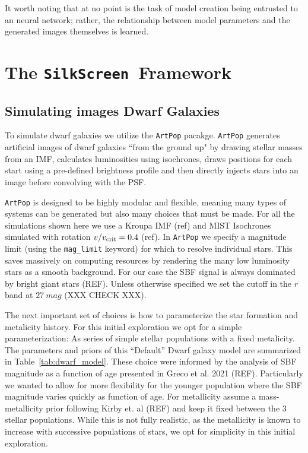 \documentclass[twocolumn]{aastex631}
\newcommand{\code}[0]{\texttt{SilkScreen}}
\newcommand{\artpop}[0]{\texttt{ArtPop}}
\begin{document}
It worth noting that at no point is the task of model creation being entrusted to an neural network; rather, the relationship between model parameters and the generated images themselves is learned. 

\section{The \code{}\ Framework}
\subsection{Simulating images Dwarf Galaxies}
\label{sec:sfh}
To simulate dwarf galaxies we utilize the \artpop{} pacakge. \artpop{} generates artificial images of dwarf galaxies ``from the ground up" by drawing stellar masses from an IMF, calculates luminosities using isochrones, draws positions for each start using a pre-defined brightness profile and then directly injects stars into an image before convolving with the PSF.

\artpop{} is designed to be highly modular and flexible, meaning many types of systems can be generated but also many choices that must be made. For all the simulations shown here we use a Kroupa IMF (ref) and MIST  Isochrones simulated with rotation $v/v_{\rm crit} = 0.4$ (ref). In \artpop{} we specify a magnitude limit (using the \texttt{mag\_limit} keyword) for which to resolve individual stars. This saves massively on computing resources by rendering the many low luminosity stars as a smooth background. For our case the SBF signal is always dominated by bright giant stars (REF).  Unless otherwise specified we set the cutoff in the $r$ band at $27\ mag$ (XXX CHECK XXX).

The next important set of choices is how to parameterize the star formation and metalicity history. For this initial exploration we opt for a simple parameterization: As series of simple stellar populations with a fixed metalicity. The parameters and priors of this ``Default'' Dwarf galaxy model are summarized in Table~\ref{tab:dwarf_model}. These choice were informed by the analysis of SBF magnitude as a function of age presented in Greco et al. 2021 (REF). Particularly we wanted to allow for more flexibility for the younger population where the SBF magnitude varies quickly as function of age. For metallicity assume a mass-metallicity prior following Kirby et. al (REF) and keep it fixed between the 3 stellar populations. While this is not fully realistic, as the metallicity is known to increase with successive populations of stars, we opt for simplicity in this initial exploration.
\end{document}
